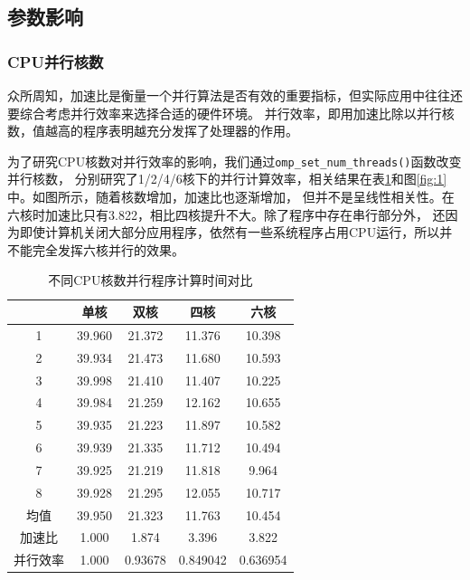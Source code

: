 \documentclass[UTF8]{ctexart}
\begin{document}
        \subsection{参数影响}
        \subsubsection{CPU并行核数}
        众所周知，加速比是衡量一个并行算法是否有效的重要指标，但实际应用中往往还要综合考虑并行效率来选择合适的硬件环境。
        并行效率，即用加速比除以并行核数，值越高的程序表明越充分发挥了处理器的作用。

        为了研究CPU核数对并行效率的影响，我们通过\texttt{omp\_set\_num\_threads()}函数改变并行核数，
        分别研究了1/2/4/6核下的并行计算效率，相关结果在表\ref{timecpu}和图\ref{fig:1}中。如图所示，随着核数增加，加速比也逐渐增加，
        但并不是呈线性相关性。在六核时加速比只有3.822，相比四核提升不大。除了程序中存在串行部分外，
        还因为即使计算机关闭大部分应用程序，依然有一些系统程序占用CPU运行，所以并不能完全发挥六核并行的效果。

        \begin{table}[]
            \centering %
            \caption{\textup{\heiti 不同CPU核数并行程序计算时间对比}}\label{timecpu} %
            \begin{tabular}{|c|c|c|c|c|}
            \hline
                 & 单核     & 双核      & 四核       & 六核       \\ \hline
            1    & 39.960 & 21.372  & 11.376   & 10.398   \\
            2    & 39.934 & 21.473  & 11.680   & 10.593   \\
            3    & 39.998 & 21.410  & 11.407   & 10.225   \\
            4    & 39.984 & 21.259  & 12.162   & 10.655   \\
            5    & 39.935 & 21.223  & 11.897   & 10.582   \\
            6    & 39.939 & 21.335  & 11.712   & 10.494   \\
            7    & 39.925 & 21.219  & 11.818   & 9.964    \\
            8    & 39.928 & 21.295  & 12.055   & 10.717   \\ \hline
            均值   & 39.950 & 21.323  & 11.763   & 10.454   \\ \hline
            加速比  & 1.000  & 1.874   & 3.396    & 3.822    \\ \hline
            并行效率 & 1.000  & 0.93678 & 0.849042 & 0.636954 \\ \hline
            \end{tabular}
        \end{table}
\end{document}

